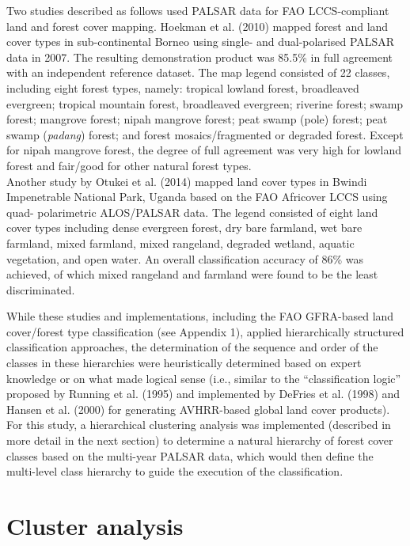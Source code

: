 Two studies described as follows used PALSAR data for FAO LCCS-compliant land and forest cover mapping. Hoekman et al. (2010) mapped forest and land cover types in sub-continental Borneo using single- and dual-polarised PALSAR data in 2007. The resulting demonstration product was 85.5\% in full agreement with an independent reference dataset. The map legend consisted of 22 classes, including eight forest types, namely: tropical lowland forest, broadleaved evergreen; tropical mountain forest, broadleaved evergreen; riverine forest; swamp forest; mangrove forest; nipah mangrove forest; peat swamp (pole) forest; peat swamp (\textit{padang}) forest; and forest mosaics/fragmented or degraded forest. Except for nipah mangrove forest, the degree of full agreement was very high for lowland forest and fair/good for other natural forest types.\\

Another study by Otukei et al. (2014) mapped land cover types in Bwindi Impenetrable National Park, Uganda based on the FAO Africover LCCS using quad- polarimetric ALOS/PALSAR data. The legend consisted of eight land cover types including dense evergreen forest, dry bare farmland, wet bare farmland, mixed farmland, mixed rangeland, degraded wetland, aquatic vegetation, and open water. An overall classification accuracy of 86\% was achieved, of which mixed rangeland and farmland were found to be the least discriminated.

While these studies and implementations, including the FAO GFRA-based land cover/forest type classification (see Appendix 1), applied hierarchically structured classification approaches, the determination of the sequence and order of the classes in these hierarchies were heuristically determined based on expert knowledge or on what made logical sense (i.e., similar to the \enquote{classification logic} proposed by Running et al. (1995) and implemented by DeFries et al. (1998) and Hansen et al. (2000) for generating AVHRR-based global land cover products). For this study, a hierarchical clustering analysis was implemented (described in more detail in the next section) to determine a natural hierarchy of forest cover classes based on the multi-year PALSAR data, which would then define the multi-level class hierarchy to guide the execution of the classification.

\section{Cluster analysis}
\label{sec: litrev-cluster-analysis}

